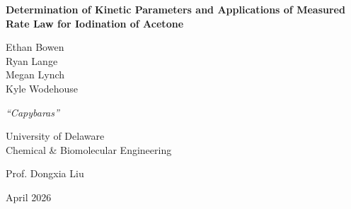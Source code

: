 
\begin{titlepage} 
\centering
\vspace*{2cm}
{\Huge \textbf{Determination of Kinetic Parameters and Applications of Measured Rate Law for Iodination of Acetone} \par}
\vspace{1.5cm}
{\Large Ethan Bowen \\ Ryan Lange \\ Megan Lynch \\ Kyle Wodehouse \par}
\vspace{0.5cm}
{\large  \textit{``Capybaras''} \par}
\vspace{1.5cm}
{\large University of Delaware \\ Chemical \& Biomolecular Engineering \par}
\vspace{0.5cm}
{\large Prof. Dongxia Liu \par}
\vspace{0.5cm}
{\large April 2026 \par}
\vfill
\end{titlepage}